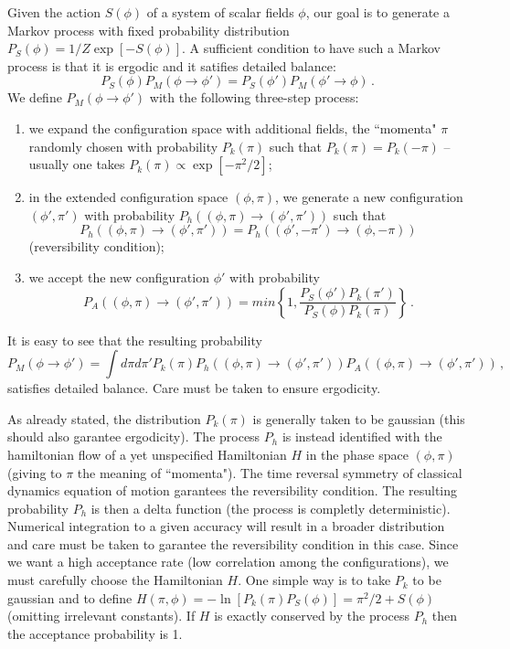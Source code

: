 \documentclass{article}[12pt]
\begin{document}
Given the action $S(\phi)$ of a system of scalar fields $\phi$, our goal is to generate a Markov process with 
fixed probability distribution $P_S(\phi) = 1/Z \exp[-S(\phi) ]$. A sufficient condition to have such a 
Markov process is that it is ergodic and it satifies detailed balance:
\begin{equation}
P_S(\phi)P_M(\phi\rightarrow \phi') = P_S(\phi')P_M(\phi' \rightarrow \phi) \, .
\end{equation}
We define $P_M(\phi \rightarrow \phi')$ with the following three-step process:
\begin{enumerate}
\item we expand the configuration space with additional fields, the ``momenta" $\pi$ randomly chosen with probability
$P_k(\pi)$ such that $P_k(\pi)=P_k(-\pi)$ -- usually one takes $P_k(\pi)\propto \exp[-\pi^2/2]$; 
\item in the extended configuration space $(\phi, \pi)$, we generate a new configuration $(\phi',\pi')$ with probability
$P_h((\phi,\pi)\rightarrow(\phi',\pi'))$ such that 
\[P_h((\phi,\pi)\rightarrow(\phi',\pi')) = P_h((\phi',-\pi')\rightarrow(\phi,-\pi))\]
(reversibility condition);
\item we accept the new configuration $\phi'$ with probability 
\[P_A((\phi,\pi)\rightarrow(\phi',\pi')) = min \left\{ 1, \frac{P_S(\phi')P_k(\pi')}{P_S(\phi)P_k(\pi)} \right\} \, .\]
\end{enumerate}
It is easy to see that the resulting probability
\begin{equation}
P_M(\phi\rightarrow\phi') = \int d\pi d\pi' P_k(\pi) P_h((\phi,\pi)\rightarrow(\phi',\pi')) P_A((\phi,\pi)\rightarrow(\phi',\pi')) \, ,
\end{equation}
satisfies detailed balance. Care must be taken to ensure ergodicity.

As already stated, the distribution $P_k(\pi)$ is generally taken to be gaussian (this should also garantee ergodicity).
The process $P_h$ is instead identified with the hamiltonian flow of a yet unspecified Hamiltonian $H$ in the phase
space $(\phi,\pi)$ (giving to $\pi$ the meaning of ``momenta"). The time reversal symmetry of classical dynamics equation of motion
garantees the reversibility condition. The resulting probability $P_h$ is then a delta function (the process is completly deterministic).
Numerical integration to a given accuracy will result in a broader distribution and care must be taken to garantee the reversibility condition 
in this case.
Since we want a high acceptance rate (low correlation among the configurations), we must carefully choose the Hamiltonian $H$.
One simple way is to take $P_k$ to be gaussian and to define $H(\pi,\phi)=-\ln [P_k(\pi) P_S(\phi)] = \pi^2/2 + S(\phi)$ 
(omitting irrelevant constants). If $H$ is exactly conserved by the process $P_h$ then the acceptance probability is 1.
\end{document}
